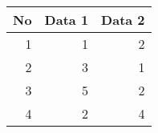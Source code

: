 \begin{tabular}{|r|r|r|}
  \hline
  \textbf{No}&  \textbf{Data 1}&  \textbf{Data 2}\\
  \hline
  1& 1& 2\\
  \hline
  2& 3& 1\\
  \hline
  3& 5& 2\\
  \hline
  4& 2& 4\\
  \hline
\end{tabular}
